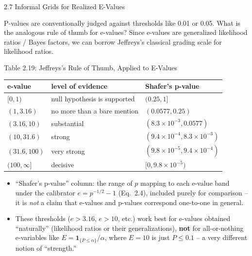 \documentclass[aspectratio=169,10pt]{beamer}
\newcommand{\ind}[1]{\mathbf{1}_{\{#1\}}}
\begin{document}
\begin{frame}[allowframebreaks]{2.7 Informal Grids for Realized E-Values}

P-values are conventionally judged against thresholds like 0.01 or 0.05.
What is the analogous rule of thumb for e-values? Since e-values are
generalized likelihood ratios / Bayes factors, we can borrow Jeffreys's
classical grading scale for likelihood ratios.

  \begin{block}{Table 2.19: Jeffreys's Rule of Thumb, Applied to E-Values}
    \centering
    \begin{tabular}{lll}
      \toprule
      \textbf{e-value} & \textbf{level of evidence} & \textbf{Shafer's p-value} \\
      \midrule
      $[0,1)$        & null hypothesis is supported & $(0.25,1]$ \\
      $(1,3.16)$     & no more than a bare mention   & $(0.0577,0.25)$ \\
      $(3.16,10)$    & substantial                   & $(8.3{\times}10^{-3},0.0577)$ \\
      $(10,31.6)$    & strong                        & $(9.4{\times}10^{-4},8.3{\times}10^{-3})$ \\
      $(31.6,100)$   & very strong                   & $(9.8{\times}10^{-5},9.4{\times}10^{-4})$ \\
      $(100,\infty]$ & decisive                      & $[0,9.8{\times}10^{-5})$ \\
      \bottomrule
    \end{tabular}
  \end{block}

  \begin{itemize}
    \item ``Shafer's p-value'' column: the range of $p$ mapping to each
      e-value band under the calibrator $e=p^{-1/2}-1$ (Eq.~2.4), included
      purely for comparison -- it is \emph{not} a claim that e-values and
      p-values correspond one-to-one in general.
    \item These thresholds ($e>3.16$, $e>10$, etc.) work best for e-values
      obtained ``naturally'' (likelihood ratios or their generalizations),
      \textbf{not} for all-or-nothing e-variables like
      $E=\ind{P\le\alpha}/\alpha$, where $E=10$ is just $P\le0.1$ -- a very
      different notion of ``strength.''
  \end{itemize}

  \framebreak


\end{frame}
\end{document}

